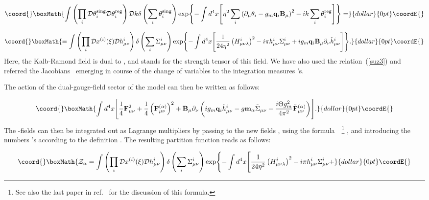 \documentclass[a4paper,12pt]{article}
\begin{document}
$$\coord{}\boxMath{
\int\left(\prod\limits_{i}^{}
{\cal D}\theta_i^{\rm sing}
{\cal D}\theta_i^{\rm reg}\right) {\cal D}k\delta\left(\sum\limits_{i}^{}
\theta_i^{\rm sing}\right)
\exp\Biggl\{-\int d^4x\Biggl[\eta^2
\sum\limits_{i}^{}\left(\partial_\mu\theta_i-
g_m{\bf q}_i{\bf B}_\mu\right)^2-ik\sum\limits_{i}^{}\theta_i^{\rm reg}\Biggr]\Biggr\}=}{dollar}{0pt}\coordE{}$$

$$\coord{}\boxMath{
=\int\left(\prod\limits_{i}^{}{\cal D}x^{(i)}(\xi){\cal D}h_{\mu\nu}^i\right)
\delta\left(\sum\limits_{i}^{}\Sigma_{\mu\nu}^i\right)
\exp\Biggl\{-\int d^4x\Biggl[\frac{1}{24\eta^2}
\left(H_{\mu\nu\lambda}^i\right)^2-i\pi h_{\mu\nu}^i\Sigma_{\mu\nu}^i+
ig_m{\bf q}_i
{\bf B}_\mu\partial_\nu \tilde h_{\mu\nu}^i\Biggr]\Biggr\}.
}{dollar}{0pt}\coordE{}$$
Here, the Kalb-Ramond field \coordHE{} is dual to \coordHE{}, and
\coordHE{} stands
for the strength tensor of this field.
We have also used the relation~(\ref{suz3})
and referred the Jacobians~\cite{polikarp} emerging in course of the change of variables \coordHE{}
to the integration measures \coordHE{}'s.

The action of the dual-gauge-field sector of the model can then be written as follows:

$$\coord{}\boxMath{\int d^4x\Biggl[
\frac14{\bf F}_{\mu\nu}^2+\frac14\left({\bf F}_{\mu\nu}^{(\alpha)}\right)^2+
{\bf B}_\mu\partial_\nu\left(
ig_m{\bf q}_i\tilde h_{\mu\nu}^i-
g{\bf m}_\alpha\tilde\Sigma_{\mu\nu}-
\frac{i\Theta g_m^2}{4\pi^2}\tilde{\bf F}_{\mu\nu}^{(\alpha)}\right)\Biggr].}{dollar}{0pt}\coordE{}$$
The \coordHE{}-fields can then be integrated out as Lagrange multipliers by passing to the
new fields \coordHE{}, using the formula~\cite{group}~\footnote{See also the last paper in ref.~\cite{suNN}
for the discussion of this formula.} \coordHE{},
and introducing the numbers \coordHE{}'s
according to the definition \coordHE{}. The resulting partition function reads
as follows:

$$\coord{}\boxMath{
{\cal Z}_\alpha=\int\left(\prod\limits_{i}^{}{\cal D}x^{(i)}(\xi){\cal D}h_{\mu\nu}^i\right)
\delta\left(\sum\limits_{i}^{}\Sigma_{\mu\nu}^i\right)
\exp\Biggl\{-\int d^4x\Biggl[\frac{1}{24\eta^2}
\left(H_{\mu\nu\lambda}^i\right)^2-i\pi h_{\mu\nu}^i\Sigma_{\mu\nu}^i+}{dollar}{0pt}\coordE{}$$
\end{document}
